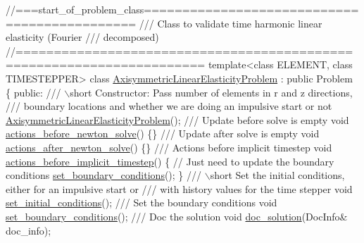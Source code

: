 
\begin{DoxyCodeInclude}
\textcolor{comment}{//===start\_of\_problem\_class=============================================}
\textcolor{comment}{/// Class to validate time harmonic linear elasticity (Fourier }
\textcolor{comment}{}\textcolor{comment}{/// decomposed)}
\textcolor{comment}{}\textcolor{comment}{//======================================================================}
\textcolor{keyword}{template}<\textcolor{keyword}{class} ELEMENT, \textcolor{keyword}{class} TIMESTEPPER>
\textcolor{keyword}{class }\hyperlink{classAxisymmetricLinearElasticityProblem}{AxisymmetricLinearElasticityProblem} : \textcolor{keyword}{public} Problem
\{
\textcolor{keyword}{public}:
\textcolor{comment}{}
\textcolor{comment}{ /// \(\backslash\)short Constructor: Pass number of elements in r and z directions,}
\textcolor{comment}{ /// boundary locations and whether we are doing an impulsive start or not}
\textcolor{comment}{} \hyperlink{classAxisymmetricLinearElasticityProblem_aaa4da18227b8b20dfba1f67bad4907ed}{AxisymmetricLinearElasticityProblem}();
\textcolor{comment}{}
\textcolor{comment}{ /// Update before solve is empty}
\textcolor{comment}{} \textcolor{keywordtype}{void} \hyperlink{classAxisymmetricLinearElasticityProblem_a25da062bc76af5ef30619a3f3ff3718f}{actions\_before\_newton\_solve}() \{\}
\textcolor{comment}{}
\textcolor{comment}{ /// Update after solve is empty}
\textcolor{comment}{} \textcolor{keywordtype}{void} \hyperlink{classAxisymmetricLinearElasticityProblem_af9b01e082da514668a89df9213afbbd5}{actions\_after\_newton\_solve}() \{\}
\textcolor{comment}{}
\textcolor{comment}{ /// Actions before implicit timestep}
\textcolor{comment}{} \textcolor{keywordtype}{void} \hyperlink{classAxisymmetricLinearElasticityProblem_a6ea18ecd60fd5878522ae6024cb57dee}{actions\_before\_implicit\_timestep}()
  \{
   \textcolor{comment}{// Just need to update the boundary conditions}
   \hyperlink{classAxisymmetricLinearElasticityProblem_ad6419d0572a6e869a5b9ba3c5aac3144}{set\_boundary\_conditions}();
  \}
\textcolor{comment}{}
\textcolor{comment}{ /// \(\backslash\)short Set the initial conditions, either for an impulsive start or}
\textcolor{comment}{ /// with history values for the time stepper}
\textcolor{comment}{} \textcolor{keywordtype}{void} \hyperlink{classAxisymmetricLinearElasticityProblem_a6b0263b6f783652a1d8151948f4b9430}{set\_initial\_conditions}();
\textcolor{comment}{}
\textcolor{comment}{ /// Set the boundary conditions}
\textcolor{comment}{} \textcolor{keywordtype}{void} \hyperlink{classAxisymmetricLinearElasticityProblem_ad6419d0572a6e869a5b9ba3c5aac3144}{set\_boundary\_conditions}();
 \textcolor{comment}{}
\textcolor{comment}{ /// Doc the solution}
\textcolor{comment}{} \textcolor{keywordtype}{void} \hyperlink{classAxisymmetricLinearElasticityProblem_a370b76b9e2902242de018339d3aedd04}{doc\_solution}(DocInfo& doc\_info);
 

\end{DoxyCodeInclude}
